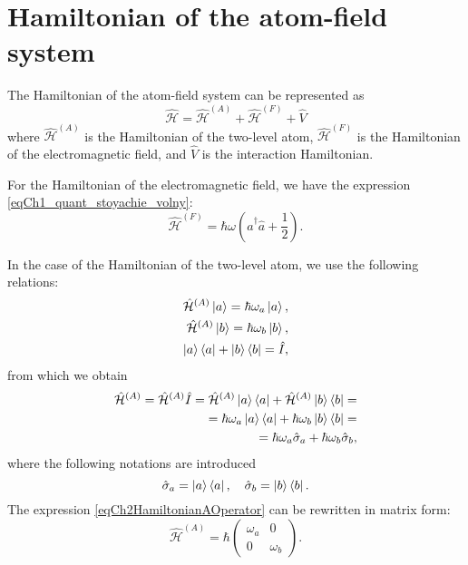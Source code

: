 \section{Hamiltonian of the atom-field system}
The Hamiltonian of the atom-field system can be represented as
\begin{equation}
\hat{\mathcal{H}} = \hat{\mathcal{H}}^{(A)} +
\hat{\mathcal{H}}^{(F)} + \hat{V}
\nonumber
\end{equation}
where
$\hat{\mathcal{H}}^{(A)}$ is the Hamiltonian of the two-level atom,
$\hat{\mathcal{H}}^{(F)}$ is the Hamiltonian of the electromagnetic field, and
$\hat{V}$ is the interaction Hamiltonian.

For the Hamiltonian of the electromagnetic field, we have the expression
\eqref{eqCh1_quant_stoyachie_volny}:
\begin{equation}
\hat{\mathcal{H}}^{(F)} = \hbar \omega 
\left(\hat{a}^{\dag}\hat{a} + \frac{1}{2}\right).
\nonumber
\end{equation}

In the case of the Hamiltonian of the two-level atom, we use the following
relations:
\begin{eqnarray}
\hat{\mathcal{H}}^{(A)}\ket{a} = \hbar \omega_a \ket{a},
\nonumber \\
\hat{\mathcal{H}}^{(A)}\ket{b} = \hbar \omega_b \ket{b},
\nonumber \\
\ket{a}\bra{a} + \ket{b}\bra{b} = \hat{I},
\nonumber
\end{eqnarray}
from which we obtain
\begin{eqnarray}
\hat{\mathcal{H}}^{(A)} = \hat{\mathcal{H}}^{(A)}\hat{I} = 
\hat{\mathcal{H}}^{(A)}
\ket{a}\bra{a} + \hat{\mathcal{H}}^{(A)}
\ket{b}\bra{b} =
\nonumber \\
 = 
\hbar\omega_a
\ket{a}\bra{a} + \hbar\omega_b
\ket{b}\bra{b} =
\nonumber \\
= \hbar \omega_a \hat{\sigma}_a +
\hbar \omega_b \hat{\sigma}_b,
\label{eqCh2HamiltonianAOperator}
\end{eqnarray}
where the following notations are introduced
\begin{equation}
\hat{\sigma}_a = \ket{a}\bra{a},
\quad
\hat{\sigma}_b = \ket{b}\bra{b}.
\nonumber
\end{equation}
The expression \eqref{eqCh2HamiltonianAOperator} can be rewritten in
matrix form:
\begin{equation}
\hat{\mathcal{H}}^{(A)} = \hbar 
\left(
\begin{array} {cc}
\omega_a & 0  
\\
0 & \omega_b 
\end{array}
\right).
\label{eqCh2HamiltonianA}
\end{equation}

